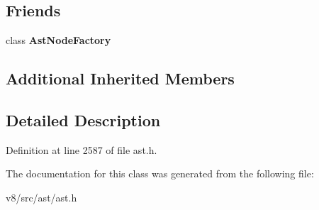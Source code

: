 \subsection*{Friends}
\begin{DoxyCompactItemize}
\item 
\mbox{\label{classv8_1_1internal_1_1InitializeClassMembersStatement_a8d587c8ad3515ff6433eb83c578e795f}} 
class {\bfseries Ast\+Node\+Factory}
\end{DoxyCompactItemize}
\subsection*{Additional Inherited Members}


\subsection{Detailed Description}


Definition at line 2587 of file ast.\+h.



The documentation for this class was generated from the following file\+:\begin{DoxyCompactItemize}
\item 
v8/src/ast/ast.\+h\end{DoxyCompactItemize}
